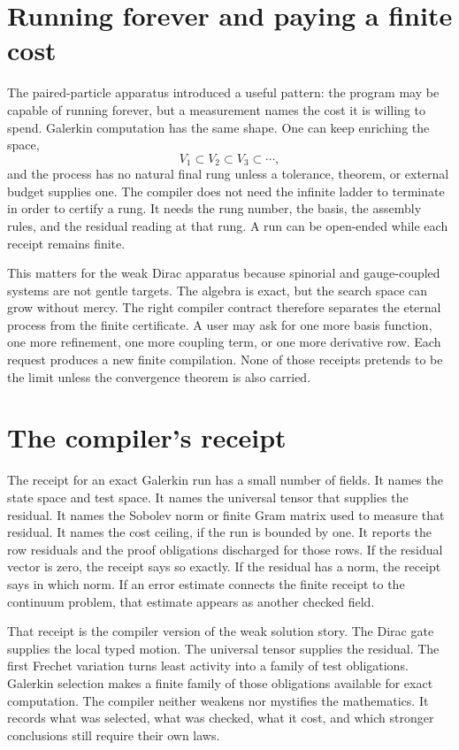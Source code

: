 \section{Running forever and paying a finite cost}
\label{se:running-forever-paying-finite-cost}

The paired-particle apparatus introduced a useful pattern: the program may be capable of running forever,
but a measurement names the cost it is willing to spend. Galerkin computation has the same shape. One can
keep enriching the space,
\[
  V_1 \subset V_2 \subset V_3 \subset \cdots ,
\]
and the process has no natural final rung unless a tolerance, theorem, or external budget supplies one. The
compiler does not need the infinite ladder to terminate in order to certify a rung. It needs the rung
number, the basis, the assembly rules, and the residual reading at that rung. A run can be open-ended while
each receipt remains finite.

This matters for the weak Dirac apparatus because spinorial and gauge-coupled systems are not gentle
targets. The algebra is exact, but the search space can grow without mercy. The right compiler contract
therefore separates the eternal process from the finite certificate. A user may ask for one more basis
function, one more refinement, one more coupling term, or one more derivative row. Each request produces a
new finite compilation. None of those receipts pretends to be the limit unless the convergence theorem is
also carried.

\section{The compiler's receipt}
\label{se:compiler-galerkin-receipt}

The receipt for an exact Galerkin run has a small number of fields. It names the state space and test
space. It names the universal tensor that supplies the residual. It names the Sobolev norm or finite Gram
matrix used to measure that residual. It names the cost ceiling, if the run is bounded by one. It reports
the row residuals and the proof obligations discharged for those rows. If the residual vector is zero, the
receipt says so exactly. If the residual has a norm, the receipt says in which norm. If an error estimate
connects the finite receipt to the continuum problem, that estimate appears as another checked field.

That receipt is the compiler version of the weak solution story. The Dirac gate supplies the local typed
motion. The universal tensor supplies the residual. The first Frechet variation turns least activity into
a family of test obligations. Galerkin selection makes a finite family of those obligations available for
exact computation. The compiler neither weakens nor mystifies the mathematics. It records what was selected,
what was checked, what it cost, and which stronger conclusions still require their own laws.

